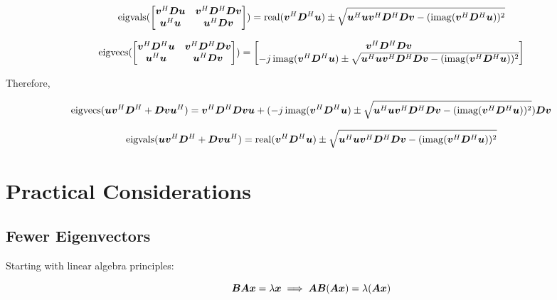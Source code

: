 \documentclass{article}
\begin{document}
\begin{equation}
\operatorname{eigvals}(\begin{bmatrix}
\bm{v}^H\bm{D}\bm{u} & \bm{v}^H\bm{D}^H\bm{D}\bm{v} \\
\bm{u}^H\bm{u}    & \bm{u}^H\bm{D}\bm{v}
\end{bmatrix})
= \operatorname{real}(\bm{v}^H\bm{D}^H\bm{u}) \pm \sqrt{\bm{u}^H\bm{u}\bm{v}^H\bm{D}^H\bm{D}\bm{v} - (\operatorname{imag}(\bm{v}^H\bm{D}^H\bm{u}))^2}
\end{equation}

\begin{equation}
\operatorname{eigvecs}
(\begin{bmatrix}
\bm{v}^H\bm{D}^H\bm{u} & \bm{v}^H\bm{D}^H\bm{D}\bm{v} \\
\bm{u}^H\bm{u}    & \bm{u}^H\bm{D}\bm{v}
\end{bmatrix})
= \begin{bmatrix}
\bm{v}^H\bm{D}^H\bm{D}\bm{v} \\
-j\operatorname{imag}(\bm{v}^H\bm{D}^H\bm{u}) \pm \sqrt{\bm{u}^H\bm{u}\bm{v}^H\bm{D}^H\bm{D}\bm{v} - (\operatorname{imag}(\bm{v}^H\bm{D}^H\bm{u}))^2}
\end{bmatrix}
\end{equation}

Therefore,

\begin{equation}
\operatorname{eigvecs}
(
\bm{u}\bm{v}^H\bm{D}^H + \bm{D}\bm{v}\bm{u}^H
) = 
\bm{v}^H\bm{D}^H\bm{D}\bm{v}\bm{u} +
(-j\operatorname{imag}(\bm{v}^H\bm{D}^H\bm{u}) \pm \sqrt{\bm{u}^H\bm{u}\bm{v}^H\bm{D}^H\bm{D}\bm{v} - (\operatorname{imag}(\bm{v}^H\bm{D}^H\bm{u}))^2})\bm{D}\bm{v}
\end{equation}

\begin{equation}
\operatorname{eigvals}(
\bm{u}\bm{v}^H \bm{D}^H + \bm{D}\bm{v}\bm{u}^H
)
= \operatorname{real}(\bm{v}^H\bm{D}^H\bm{u}) \pm \sqrt{\bm{u}^H\bm{u}\bm{v}^H\bm{D}^H\bm{D}\bm{v} - (\operatorname{imag}(\bm{v}^H\bm{D}^H\bm{u}))^2}
\end{equation}

\section{Practical Considerations}
\subsection{Fewer Eigenvectors}

Starting with linear algebra principles:

\begin{equation}
\bm{B}\bm{A}\bm{x} = \lambda\bm{x} \implies \bm{A}\bm{B}(\bm{A}\bm{x}) = \lambda (\bm{A}\bm{x})
\end{equation}
\end{document}
